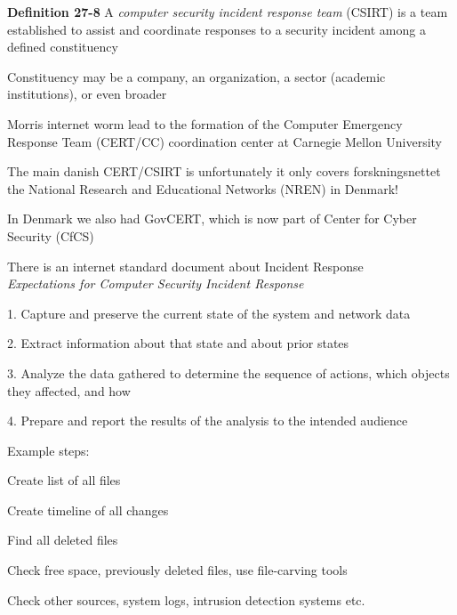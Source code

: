 \documentclass[Screen16to9,17pt]{foils}
\begin{document}
\begin{list2}
\item {\bf Definition 27-8} A \emph{computer security incident response team} (CSIRT) is a team established to assist and coordinate responses to a security incident among a defined constituency
\item Constituency may be a company, an organization, a sector (academic institutions), or even broader
\item Morris internet worm lead to the formation of the Computer Emergency Response Team (CERT/CC) coordination center at Carnegie Mellon University \\
\item The main danish CERT/CSIRT is  unfortunately it only covers forskningsnettet the National Research and Educational Networks (NREN) in Denmark!
\item In Denmark we also had GovCERT, which is now part of Center for Cyber Security (CfCS)
\item There is an internet standard document about Incident Response\\
\emph{Expectations for Computer Security Incident Response
}
\end{list2}



\begin{list2}
\item 1. Capture and preserve the current state of the system and network data
\item 2. Extract information about that state and about prior states
\item 3. Analyze the data gathered to determine the sequence of actions, which objects they affected, and how
\item 4. Prepare and report the results of the analysis to the intended audience
\vskip 1cm
\item Example steps:
\item Create list of all files
\item Create timeline of all changes
\item Find all deleted files
\item Check free space, previously deleted files, use file-carving tools
\item Check other sources, system logs, intrusion detection systems etc.
\end{list2}
\end{document}
